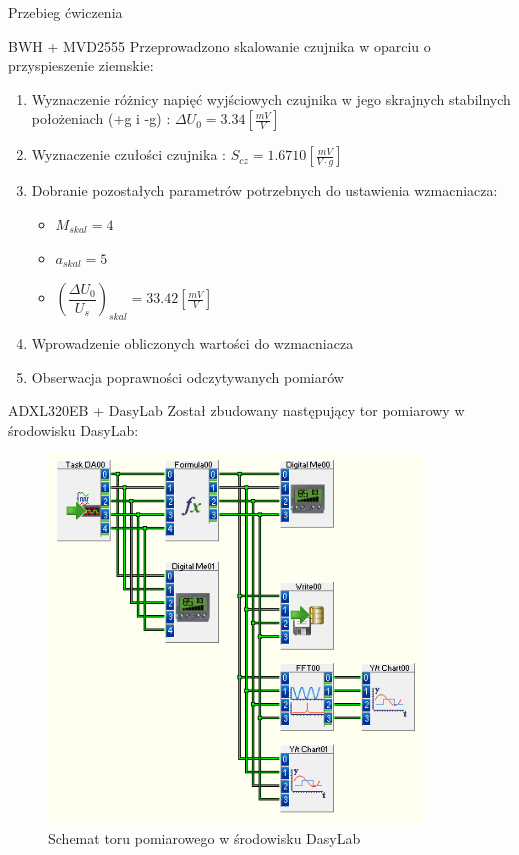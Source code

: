 \documentclass[12pt]{article}
\begin{document}
\begin{section}{Przebieg ćwiczenia}
	\begin{subsection}{BWH + MVD2555}
        Przeprowadzono skalowanie czujnika w oparciu o przyspieszenie ziemskie:
        \begin{enumerate}
          \item Wyznaczenie różnicy napięć wyjściowych czujnika w jego skrajnych
          stabilnych położeniach (+g i -g) : $\Delta U_0=3.34[\frac{mV}{V}]$
          \item Wyznaczenie czułości czujnika : $S_{cz}=1.6710[\frac{mV}{V\cdot
          g}]$
          \item Dobranie pozostałych parametrów potrzebnych do ustawienia
          wzmacniacza:
          \begin{itemize}
            \item $M_{skal}=4$
            \item $a_{skal}=5$
            \item $\left(\dfrac{\Delta U_0}{U_s}\right)_{skal}=33.42[\frac{mV}{V}]$
          \end{itemize}
          \item Wprowadzenie obliczonych wartości do wzmacniacza
          \item Obserwacja poprawności odczytywanych pomiarów
        \end{enumerate}
	\end{subsection}
	
	\newpage
	
	\begin{subsection}{ADXL320EB + DasyLab}
        Został zbudowany następujący tor pomiarowy w środowisku DasyLab:
        \begin{figure}[!htb]
            \begin{center}
                \includegraphics[width=10cm]{../res/img/dasylab.png}
            \end{center}
            \caption{Schemat toru pomiarowego w środowisku DasyLab}
            \label{rys:dasy_sch}
        \end{figure}
        

\end{subsection}
\end{section}
\end{document}

